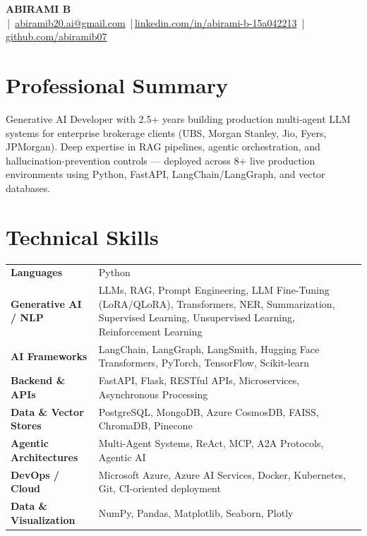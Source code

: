 \documentclass[11pt, letterpaper]{article}
\newcommand{\skillrow}[2]{%
    \fontsize{11}{13}\selectfont\textbf{#1} & \fontsize{11}{13}\selectfont #2 \\[5pt]
}
\begin{document}
\setlength{\parindent}{0pt}

\begin{center}
    {\fontsize{24}{28}\selectfont\textbf{ABIRAMI B}} \\[3pt]
    {\fontsize{11}{13} \,|\, \href{mailto:abiramib20.ai@gmail.com}{abiramib20.ai@gmail.com} \,|\,\href{https://www.linkedin.com/in/abirami-b-15a042213}{linkedin.com/in/abirami-b-15a042213} \,|\,\href{https://github.com/abiramib07}{github.com/abiramib07}}
\end{center}
\vspace{6pt}

\section*{Professional Summary}
\fontsize{11}{12}\selectfont
Generative AI Developer with 2.5+ years building production multi-agent LLM systems for enterprise brokerage clients (UBS, Morgan Stanley, Jio, Fyers, JPMorgan). Deep expertise in RAG pipelines, agentic orchestration, and hallucination-prevention controls --- deployed across 8+ live production environments using Python, FastAPI, LangChain/LangGraph, and vector databases.

\vspace{8pt}

\section*{Technical Skills}
\renewcommand{\arraystretch}{1.1}
\noindent\begin{tabularx}{\textwidth}{@{}p{5.6cm} X@{}}
    \skillrow{Languages}{Python}
    \skillrow{Generative AI / NLP}{LLMs, RAG, Prompt Engineering, LLM Fine-Tuning (LoRA/QLoRA), Transformers, NER, Summarization, Supervised Learning, Unsupervised Learning, Reinforcement Learning}
    \skillrow{AI Frameworks}{LangChain, LangGraph, LangSmith, Hugging Face Transformers, PyTorch, TensorFlow, Scikit-learn}
    \skillrow{Backend \& APIs}{FastAPI, Flask, RESTful APIs, Microservices, Asynchronous Processing}
    \skillrow{Data \& Vector Stores}{PostgreSQL, MongoDB, Azure CosmosDB, FAISS, ChromaDB, Pinecone}
    \skillrow{Agentic Architectures}{Multi-Agent Systems, ReAct, MCP, A2A Protocols, Agentic AI}
    \skillrow{DevOps / Cloud}{Microsoft Azure, Azure AI Services, Docker, Kubernetes, Git, CI-oriented deployment}
    \skillrow{Data \& Visualization}{NumPy, Pandas, Matplotlib, Seaborn, Plotly}
\end{tabularx}
\end{document}
